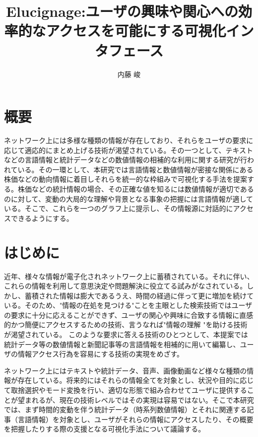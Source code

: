 \documentclass{matsushita-zemi}
\title{Elucignage:ユーザの興味や関心への効率的なアクセスを可能にする可視化インタフェース}
\author{内藤 峻}
\begin{document}
\maketitle

\section*{概要}
\label{abstract}
ネットワーク上には多様な種類の情報が存在しており、それらをユーザの要求に応じて適応的にまとめ上げる技術が渇望されている。その一つとして、テキストなどの言語情報と統計データなどの数値情報の相補的な利用に関する研究が行われている。その一環として、本研究では言語情報と数値情報が密接な関係にある株価などの動向情報に着目しそれらを統一的な枠組みで可視化する手法を提案する。株価などの統計情報の場合、その正確な値を知るには数値情報が適切であるのに対して、変動の大局的な理解や背景となる事象の把握には言語情報が適している。そこで、これらを一つのグラフ上に提示し、その情報源に対話的にアクセスできるようにする。

\section{はじめに}
\label{background}
近年、様々な情報が電子化されネットワーク上に蓄積されている。それに伴い、これらの情報を利用して意思決定や問題解決に役立てる試みがなされている。しかし、蓄積された情報は膨大であるうえ、時間の経過に伴って更に増加を続けている。そのため、"情報の在処を見つける"ことを主眼とした検索技術ではユーザの要求に十分に応えることができず、ユーザの関心や興味に合致する情報に直感的かつ簡便にアクセスするための技術、言うなれば"情報の理解   "を助ける技術が渇望されている\cite{Elucignage}。
このような要求に答える技術のひとつとして、本提案では統計データ等の数値情報と新聞記事等の言語情報を相補的に用いて編纂し、ユーザの情報アクセス行為を容易にする技術の実現をめざす\cite{information_compilation}。

ネットワーク上にはテキストや統計データ、音声、画像動画など様々な種類の情報が存在している。将来的にはそれらの情報全てを対象とし、状況や目的に応じて取捨選択やモード変換を行い、適切な形態で組み合わせてユーザに提供することが望まれるが、現在の技術レベルではその実現は容易ではない。そこで本研究では、まず時間的変動を伴う統計データ（時系列数値情報）とそれに関連する記事（言語情報）を対象とし、ユーザがそれらの情報にアクセスしたり、その概要を把握したりする際の支援となる可視化手法について議論する\cite{Elucignage-jsai}。
\end{document}
